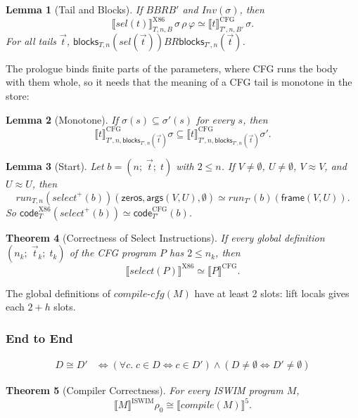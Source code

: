 \documentclass[10pt]{article}
\theoremstyle{acmplain}
\newtheorem{theorem}{Theorem}[section]
\newtheorem{lemma}[theorem]{Lemma}
\newcommand{\SEM}[1]{\llbracket #1 \rrbracket}
\newcommand{\key}[1]{\mathsf{#1}}
\newcommand{\pass}[1]{\mathit{#1}}
\newcommand{\NE}{\neq\emptyset}
\newcommand{\obseq}{\cong}
\begin{document}
\begin{lemma}[Tail and Blocks]\label{lem:sel-tail}
If $B \mathrel{\mathit{BR}} B'$ and $\mathit{Inv}(\sigma)$, then
\[
  \SEM{\pass{sel}(t)}^{\mathrm{X86}}_{T,n,B}\,\sigma\,\rho\,\varphi \simeq \SEM{t}^{\mathrm{CFG}}_{T',n,B'}\,\sigma .
\]
For all tails $\vec{t}$,
$\key{blocks}_{T,n}(\pass{sel}(\vec{t})) \mathrel{\mathit{BR}} \key{blocks}_{T',n}(\vec{t})$.
\end{lemma}

The prologue binds finite parts of the parameters, where CFG runs the
body with them whole, so it needs that the meaning of a CFG tail is
monotone in the store:

\begin{lemma}[Monotone]\label{lem:cfg-mono}
If $\sigma(s) \subseteq \sigma'(s)$ for every $s$, then
\[
  \SEM{t}^{\mathrm{CFG}}_{T',n,\key{blocks}_{T',n}(\vec{t})}\sigma \subseteq
  \SEM{t}^{\mathrm{CFG}}_{T',n,\key{blocks}_{T',n}(\vec{t})}\sigma' .
\]
\end{lemma}

\begin{lemma}[Start]\label{lem:sel-start}
Let $b = (n;\; \vec{t};\; t)$ with $2 \leq n$. If $V \NE$, $U \NE$,
$V \approx V$, and $U \approx U$, then
\[
  \mathit{run}_{T,n}(\pass{select}^{+}(b))(\key{zeros}, \key{args}(V, U), \emptyset)
  \simeq \mathit{run}_{T'}(b)(\key{frame}(V, U)) .
\]
So $\key{code}^{\mathrm{X86}}_T(\pass{select}^{+}(b)) \simeq \key{code}^{\mathrm{CFG}}_{T'}(b)$.
\end{lemma}

\begin{theorem}[Correctness of Select Instructions]\label{thm:select}
If every global definition $(n_k;\; \vec{t}_k;\; t_k)$ of the CFG
program $P$ has $2 \leq n_k$, then
\[
  \SEM{\pass{select}(P)}^{\mathrm{X86}} \simeq \SEM{P}^{\mathrm{CFG}} .
\]
\end{theorem}
The global definitions of $\pass{compile\text{-}cfg}(M)$ have at least
2 slots: lift locals gives each $2 + h$ slots.

\subsubsection{End to End}

\begin{align*}
  D \obseq D' &\iff (\forall c.\; c \in D \iff c \in D') \land (D \NE \iff D' \NE)
\end{align*}

\begin{theorem}[Compiler Correctness]\label{thm:compiler}
For every ISWIM program $M$,
\[
  \SEM{M}^{\mathrm{ISWIM}}\rho_0 \obseq \SEM{\pass{compile}(M)}^{\mathrm{5}} .
\]
\end{theorem}
\end{document}

